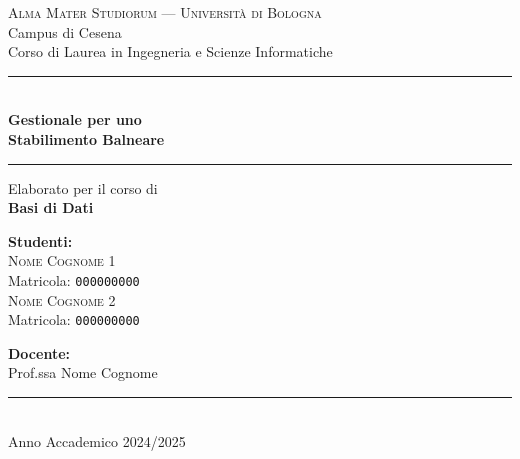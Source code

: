 \begin{titlepage}
  \centering
  \vspace*{1cm}


  {\large\textcolor{primary}{\textsc{Alma Mater Studiorum --- Università di Bologna}}}\\[0.3cm]
  {\large Campus di Cesena}\\[0.2cm]
  {\large Corso di Laurea in Ingegneria e Scienze Informatiche}

  \vspace{1.5cm}
  \rule{\linewidth}{1pt}\\[0.6cm]

  {\Huge\bfseries\color{primary} Gestionale per uno}\\[0.4cm]
  {\Huge\bfseries\color{primary} Stabilimento Balneare}\\[0.6cm]

  \rule{\linewidth}{1pt}

  \vspace{0.8cm}
  {\Large Elaborato per il corso di}\\[0.3cm]
  {\LARGE\bfseries\color{accent} Basi di Dati}

  \vfill

  \begin{minipage}{0.45\textwidth}
    \raggedright
    \textbf{Studenti:}\\[0.3cm]
    \textsc{Nome Cognome 1}\\
    Matricola: \texttt{000000000}\\[0.4cm]
    \textsc{Nome Cognome 2}\\
    Matricola: \texttt{000000000}
  \end{minipage}
  \hfill
  \begin{minipage}{0.45\textwidth}
    \raggedleft
    \textbf{Docente:}\\[0.3cm]
    Prof.ssa Nome Cognome
  \end{minipage}

  \vspace{1.5cm}
  \rule{\linewidth}{0.5pt}\\[0.4cm]
  {\large Anno Accademico 2024/2025}

\end{titlepage}

\thispagestyle{empty}
\cleardoublepage
